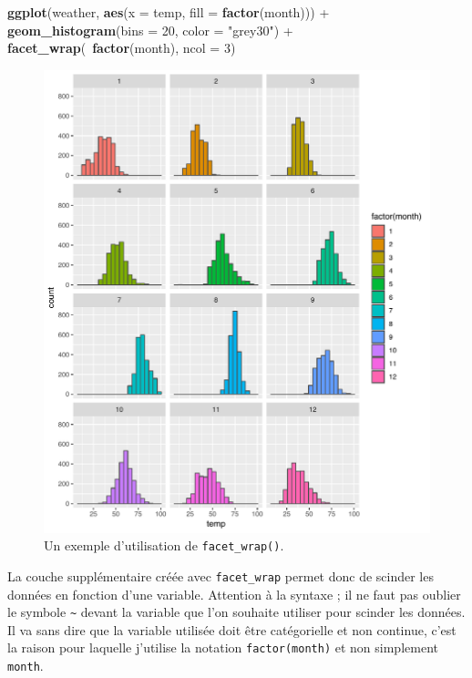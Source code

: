 \documentclass[a4paperpaper,]{article}
\newenvironment{Shaded}{\begin{snugshade}}{\end{snugshade}}
\newcommand{\DataTypeTok}[1]{\textcolor[rgb]{0.00,0.34,0.68}{#1}}
\newcommand{\DecValTok}[1]{\textcolor[rgb]{0.69,0.50,0.00}{#1}}
\newcommand{\KeywordTok}[1]{\textcolor[rgb]{0.12,0.11,0.11}{\textbf{#1}}}
\newcommand{\NormalTok}[1]{\textcolor[rgb]{0.12,0.11,0.11}{#1}}
\newcommand{\OperatorTok}[1]{\textcolor[rgb]{0.12,0.11,0.11}{#1}}
\newcommand{\StringTok}[1]{\textcolor[rgb]{0.75,0.01,0.01}{#1}}
\theoremstyle{definition}
\theoremstyle{definition}
\theoremstyle{definition}
\theoremstyle{remark}
\begin{document}
\begin{Shaded}
\begin{Highlighting}[]
\KeywordTok{ggplot}\NormalTok{(weather, }\KeywordTok{aes}\NormalTok{(}\DataTypeTok{x =}\NormalTok{ temp, }\DataTypeTok{fill =} \KeywordTok{factor}\NormalTok{(month))) }\OperatorTok{+}
\StringTok{  }\KeywordTok{geom_histogram}\NormalTok{(}\DataTypeTok{bins =} \DecValTok{20}\NormalTok{, }\DataTypeTok{color =} \StringTok{"grey30"}\NormalTok{) }\OperatorTok{+}
\StringTok{  }\KeywordTok{facet_wrap}\NormalTok{(}\OperatorTok{~}\KeywordTok{factor}\NormalTok{(month), }\DataTypeTok{ncol =} \DecValTok{3}\NormalTok{)}
\end{Highlighting}
\end{Shaded}

\begin{figure}[htpb]

{\centering \includegraphics[width=0.9\linewidth]{figure/wrap-1} 

}

\caption{Un exemple d'utilisation de \texttt{facet\_wrap()}.}\label{fig:wrap}
\end{figure}



La couche supplémentaire créée avec \texttt{facet\_wrap} permet donc de
scinder les données en fonction d'une variable. Attention à la syntaxe ;
il ne faut pas oublier le symbole \texttt{\textasciitilde{}} devant la
variable que l'on souhaite utiliser pour scinder les données. Il va sans
dire que la variable utilisée doit être catégorielle et non continue,
c'est la raison pour laquelle j'utilise la notation
\texttt{factor(month)} et non simplement \texttt{month}.
\end{document}
